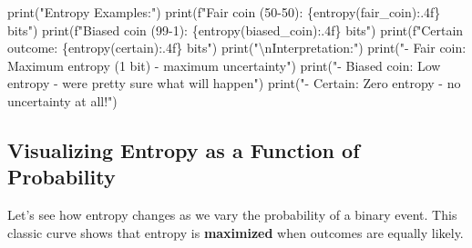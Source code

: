 \documentclass[
  11pt,
  letterpaper,
  oneside,
  openany]{book}
\newenvironment{Shaded}{\begin{snugshade}}{\end{snugshade}}
\newcommand{\BuiltInTok}[1]{\textcolor[rgb]{0.00,0.23,0.31}{#1}}
\newcommand{\CharTok}[1]{\textcolor[rgb]{0.13,0.47,0.30}{#1}}
\newcommand{\NormalTok}[1]{\textcolor[rgb]{0.00,0.23,0.31}{#1}}
\newcommand{\SpecialCharTok}[1]{\textcolor[rgb]{0.37,0.37,0.37}{#1}}
\newcommand{\SpecialStringTok}[1]{\textcolor[rgb]{0.13,0.47,0.30}{#1}}
\newcommand{\StringTok}[1]{\textcolor[rgb]{0.13,0.47,0.30}{#1}}
\begin{document}
\begin{Shaded}
\begin{Highlighting}[]
\BuiltInTok{print}\NormalTok{(}\StringTok{"Entropy Examples:"}\NormalTok{)}
\BuiltInTok{print}\NormalTok{(}\SpecialStringTok{f"Fair coin (50{-}50): }\SpecialCharTok{\{}\NormalTok{entropy(fair\_coin)}\SpecialCharTok{:.4f\}}\SpecialStringTok{ bits"}\NormalTok{)}
\BuiltInTok{print}\NormalTok{(}\SpecialStringTok{f"Biased coin (99{-}1): }\SpecialCharTok{\{}\NormalTok{entropy(biased\_coin)}\SpecialCharTok{:.4f\}}\SpecialStringTok{ bits"}\NormalTok{)}
\BuiltInTok{print}\NormalTok{(}\SpecialStringTok{f"Certain outcome: }\SpecialCharTok{\{}\NormalTok{entropy(certain)}\SpecialCharTok{:.4f\}}\SpecialStringTok{ bits"}\NormalTok{)}
\BuiltInTok{print}\NormalTok{(}\StringTok{"}\CharTok{\textbackslash{}n}\StringTok{Interpretation:"}\NormalTok{)}
\BuiltInTok{print}\NormalTok{(}\StringTok{"{-} Fair coin: Maximum entropy (1 bit) {-} maximum uncertainty"}\NormalTok{)}
\BuiltInTok{print}\NormalTok{(}\StringTok{"{-} Biased coin: Low entropy {-} we\textquotesingle{}re pretty sure what will happen"}\NormalTok{)}
\BuiltInTok{print}\NormalTok{(}\StringTok{"{-} Certain: Zero entropy {-} no uncertainty at all!"}\NormalTok{)}
\end{Highlighting}
\end{Shaded}

\subsection{Visualizing Entropy as a Function of
Probability}\label{visualizing-entropy-as-a-function-of-probability}

Let's see how entropy changes as we vary the probability of a binary
event. This classic curve shows that entropy is \textbf{maximized} when
outcomes are equally likely.
\end{document}
